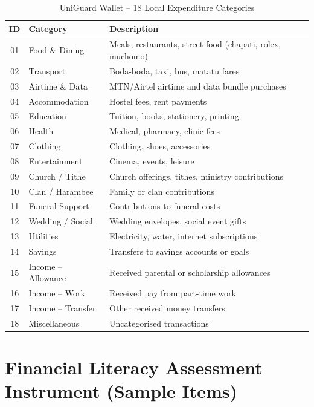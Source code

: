 \documentclass[12pt]{report}
\begin{document}
\begin{appendices}
\begin{table}[H]
\centering
\caption{UniGuard Wallet -- 18 Local Expenditure Categories}
\label{tab:categories}
\begin{tabular}{clp{6cm}}
\toprule
\textbf{ID} & \textbf{Category} & \textbf{Description} \\
\midrule
01 & Food \& Dining         & Meals, restaurants, street food (chapati, rolex, muchomo) \\
02 & Transport              & Boda-boda, taxi, bus, matatu fares \\
03 & Airtime \& Data        & MTN/Airtel airtime and data bundle purchases \\
04 & Accommodation          & Hostel fees, rent payments \\
05 & Education              & Tuition, books, stationery, printing \\
06 & Health                 & Medical, pharmacy, clinic fees \\
07 & Clothing               & Clothing, shoes, accessories \\
08 & Entertainment          & Cinema, events, leisure \\
09 & Church / Tithe         & Church offerings, tithes, ministry contributions \\
10 & Clan / Harambee        & Family or clan contributions \\
11 & Funeral Support        & Contributions to funeral costs \\
12 & Wedding / Social       & Wedding envelopes, social event gifts \\
13 & Utilities              & Electricity, water, internet subscriptions \\
14 & Savings                & Transfers to savings accounts or goals \\
15 & Income -- Allowance    & Received parental or scholarship allowances \\
16 & Income -- Work         & Received pay from part-time work \\
17 & Income -- Transfer     & Other received money transfers \\
18 & Miscellaneous          & Uncategorised transactions \\
\bottomrule
\end{tabular}
\end{table}

\chapter{Financial Literacy Assessment Instrument (Sample Items)}


\end{appendices}
\end{document}
